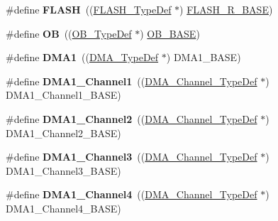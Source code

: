 \begin{DoxyCompactItemize}
\item 
\hypertarget{group___peripheral__declaration_ga844ea28ba1e0a5a0e497f16b61ea306b}{\#define {\bfseries F\-L\-A\-S\-H}~((\hyperlink{struct_f_l_a_s_h___type_def}{F\-L\-A\-S\-H\-\_\-\-Type\-Def} $\ast$) \hyperlink{group___peripheral__memory__map_ga8e21f4845015730c5731763169ec0e9b}{F\-L\-A\-S\-H\-\_\-\-R\-\_\-\-B\-A\-S\-E})}\label{group___peripheral__declaration_ga844ea28ba1e0a5a0e497f16b61ea306b}

\item 
\hypertarget{group___peripheral__declaration_gad2d5f875cdc6d696735f20fa23a895c3}{\#define {\bfseries O\-B}~((\hyperlink{struct_o_b___type_def}{O\-B\-\_\-\-Type\-Def} $\ast$) \hyperlink{group___peripheral__memory__map_gab5b5fb155f9ee15dfb6d757da1adc926}{O\-B\-\_\-\-B\-A\-S\-E})}\label{group___peripheral__declaration_gad2d5f875cdc6d696735f20fa23a895c3}

\item 
\hypertarget{group___peripheral__declaration_gacc16d2a5937f7585320a98f7f6b578f9}{\#define {\bfseries D\-M\-A1}~((\hyperlink{struct_d_m_a___type_def}{D\-M\-A\-\_\-\-Type\-Def} $\ast$) D\-M\-A1\-\_\-\-B\-A\-S\-E)}\label{group___peripheral__declaration_gacc16d2a5937f7585320a98f7f6b578f9}

\item 
\hypertarget{group___peripheral__declaration_gac83c5be824be1c02716e2522e80ddf7a}{\#define {\bfseries D\-M\-A1\-\_\-\-Channel1}~((\hyperlink{struct_d_m_a___channel___type_def}{D\-M\-A\-\_\-\-Channel\-\_\-\-Type\-Def} $\ast$) D\-M\-A1\-\_\-\-Channel1\-\_\-\-B\-A\-S\-E)}\label{group___peripheral__declaration_gac83c5be824be1c02716e2522e80ddf7a}

\item 
\hypertarget{group___peripheral__declaration_ga23d7631dd10c645e06971b2543ba2949}{\#define {\bfseries D\-M\-A1\-\_\-\-Channel2}~((\hyperlink{struct_d_m_a___channel___type_def}{D\-M\-A\-\_\-\-Channel\-\_\-\-Type\-Def} $\ast$) D\-M\-A1\-\_\-\-Channel2\-\_\-\-B\-A\-S\-E)}\label{group___peripheral__declaration_ga23d7631dd10c645e06971b2543ba2949}

\item 
\hypertarget{group___peripheral__declaration_gacf7b6093a37b306d7f1f50b2f200f0d0}{\#define {\bfseries D\-M\-A1\-\_\-\-Channel3}~((\hyperlink{struct_d_m_a___channel___type_def}{D\-M\-A\-\_\-\-Channel\-\_\-\-Type\-Def} $\ast$) D\-M\-A1\-\_\-\-Channel3\-\_\-\-B\-A\-S\-E)}\label{group___peripheral__declaration_gacf7b6093a37b306d7f1f50b2f200f0d0}

\item 
\hypertarget{group___peripheral__declaration_gad2c42743316bf64da557130061b1f56a}{\#define {\bfseries D\-M\-A1\-\_\-\-Channel4}~((\hyperlink{struct_d_m_a___channel___type_def}{D\-M\-A\-\_\-\-Channel\-\_\-\-Type\-Def} $\ast$) D\-M\-A1\-\_\-\-Channel4\-\_\-\-B\-A\-S\-E)}\label{group___peripheral__declaration_gad2c42743316bf64da557130061b1f56a}


\end{DoxyCompactItemize}
